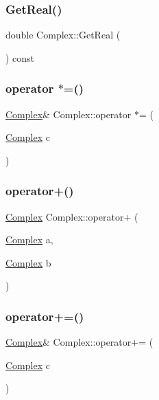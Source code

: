 \subsubsection{\texorpdfstring{GetReal()}{GetReal()}}
{\footnotesize\ttfamily double Complex\+::\+Get\+Real (\begin{DoxyParamCaption}{ }\end{DoxyParamCaption}) const\hspace{0.3cm}{\ttfamily [inline]}}

\mbox{\label{class_complex_aece50b1266b3f13c161fe9ff335c10e5}} 
\subsubsection{\texorpdfstring{operator $\ast$=()}{operator *=()}}
{\footnotesize\ttfamily \mbox{\hyperlink{class_complex}{Complex}}\& Complex\+::operator $\ast$= (\begin{DoxyParamCaption}\item[{\mbox{\hyperlink{class_complex}{Complex}}}]{c }\end{DoxyParamCaption})}

\mbox{\label{class_complex_aec00ed797b4e317862c3c42a3cc42c77}} 
\subsubsection{\texorpdfstring{operator+()}{operator+()}}
{\footnotesize\ttfamily \mbox{\hyperlink{class_complex}{Complex}} Complex\+::operator+ (\begin{DoxyParamCaption}\item[{\mbox{\hyperlink{class_complex}{Complex}}}]{a,  }\item[{\mbox{\hyperlink{class_complex}{Complex}}}]{b }\end{DoxyParamCaption})\hspace{0.3cm}{\ttfamily [inline]}}

\mbox{\label{class_complex_a56c23d43b54279ea82e5c66df7b418d2}} 
\subsubsection{\texorpdfstring{operator+=()}{operator+=()}}
{\footnotesize\ttfamily \mbox{\hyperlink{class_complex}{Complex}}\& Complex\+::operator+= (\begin{DoxyParamCaption}\item[{\mbox{\hyperlink{class_complex}{Complex}}}]{c }\end{DoxyParamCaption})\hspace{0.3cm}{\ttfamily [inline]}}

